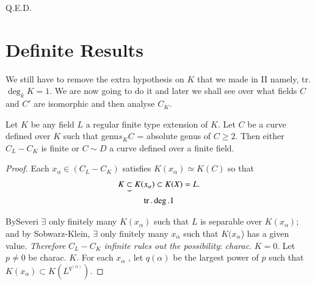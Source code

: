 \hfill{Q.E.D.} 

\section{Definite Results}\label{chap3:sec3}

We still have to remove the extra  hypothesis on $K$ that we made in
II namely, tr. $\deg_k K = 1$. We are now going to do it and later
we shall see over what fields $C$ and $C'$ are isomorphic and then
analyse $C_{K}$. 

\setcounter{proposition}{0}
\begin{proposition}\label{chap3:sec3:prop1}%
  Let $K$ be any field $L$ a regular finite type extension of $K$. Let
  $C$ be a curve defined over $K$ such that genu$s_KC$ = absolute
  genus of $C \geq 2$. Then either $C_{L} - C_K$ is finite or $C \sim
  D$ a curve defined over a finite field.  
\end{proposition}

\begin{proof}%
  Each $x_{\alpha}\in(C_L - C_K)$  satisfies $K(x _ \alpha ) \simeq
  K(C)$ so that 
\begin{gather*}
  \underset{\smile}{ K \subset K}(x_\alpha)\subset K(X)= L.\\
  \operatorname{tr}.\deg.1
\end{gather*}

By\pageoriginale Severi $\exists$ only finitely many $K(x_\alpha)$ such that $L$ is
separable over $K(x_\alpha);$ and by Sobwarz-Klein, $\exists$ only
finitely many $x_\alpha$  such that $K(x_\alpha$) has a given
value. \textit{Therefore} $C_L -C_K$ \textit{infinite rules out the
  possibility}: \textit{charac}. $K = 0$. Let $p\neq 0$ be
charac. $K$. For each $x_\alpha$ , let $q(\alpha)$ be the largest
power of $p$ such that $K(x_\alpha)\subset K(L^{q^{(\alpha)}})$. 
\end{proof}

